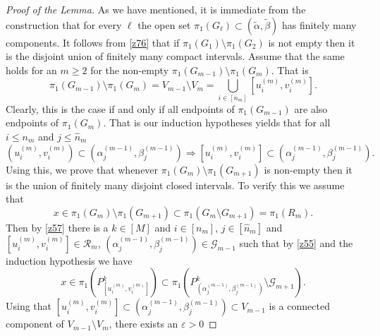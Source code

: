 \documentclass[amssymb,amsfonts,12pt,verbatim,righttag,oneside]{amsart}
\numberwithin{equation}{section} %
\theoremstyle{plain}
\theoremstyle{plain}
\begin{document}
\begin{proof}[Proof of the Lemma]
As we have mentioned,  it is immediate from the construction that for every $\ell $
the open set $\pi _1(G_{\ell })\subset (\widetilde{\alpha },\widetilde{\beta })$ has finitely many components.
It follows from \eqref{z76}
that if $\pi _1(G_1)\setminus \pi _1(G_2) $ is not empty then it is the disjoint union  of finitely many
compact intervals. Assume that the same holds for an $m\geq 2$
for the non-empty $\pi _1(G_{m-1})\setminus \pi _1(G_{m})$.
That is
\begin{equation}
\label{z56}
\pi _1(G_{m-1})\setminus \pi _1(G_{m})
=
V_{m-1}\setminus V_m
=
\bigcup\limits_{i\in [n_m]}
\left[ u_i^{(m)}, v_i^{(m)} \right].
\end{equation}
Clearly, this is the case if and only if all
 endpoints of $\pi _1(G_{m-1})$
are also endpoints of $\pi _1(G_{m})$. That is our induction hypotheses yields that for all $i\leq n_m$ and $j\leq \widehat{n}_m$
\begin{equation}
\label{z69}
  \left( u _{i}^{(m) },v _{i}^{(m) } \right)
\subset
\left( \alpha _{j}^{(m-1) }, \beta _{j}^{(m-1) } \right) \Longrightarrow
\left[ u _{i}^{(m) },v _{i}^{(m) } \right]
\subset
\left( \alpha _{j}^{(m-1) }, \beta _{j}^{(m-1) } \right).
\end{equation}
Using this, we  prove that whenever
$\pi _1(G_{m})\setminus \pi _1(G_{m+1})$ is non-empty then it is the union of finitely many disjoint closed intervals.
To verify this we assume that
\begin{equation}
\label{z55}
x\in \pi _1(G_{m})\setminus \pi _1(G_{m+1})\subset \pi _1\left( G_m\setminus G_{m+1} \right)=\pi _1(R_m).
\end{equation}
Then by \eqref{z57} there is a $k\in [M]$ and $i\in [n_m]$, $j\in[\widehat{n}_m]$
and
$\left[ u _{i}^{(m) },v _{i}^{(m) } \right]\in\mathcal{R}_m$,
$\left(  \alpha _{j}^{(m-1) },\beta  _{j}^{(m-1) } \right)\in
\mathcal{G}_{m-1}
$
such that by
\eqref{z55} and
the induction hypothesis we have
\begin{equation}
\label{z53}
x\in
\pi _1\left( P _{ \left[ u _{i}^{(m) },v _{i}^{(m) } \right]  }^{k } \right)
\subset
\pi _1 \left( P _{ \left(  \alpha _{j}^{(m-1) },\beta  _{j}^{(m-1) } \right)}^{k } {\setminus \mathcal{G}_{m+1}}\right).
\end{equation}
Using that $\left[ u _{i}^{(m) },v _{i}^{(m) } \right]\subset \left( \alpha _{j}^{(m-1) }, \beta _{j}^{(m-1) } \right) \subset  V_{m-1} $ is a connected component of $V_{m-1}\setminus V_m$, there exists an $\varepsilon >0$

\end{proof}
\end{document}

